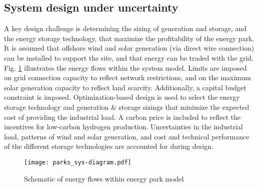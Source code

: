 \subsection{System design under uncertainty}

A key design challenge is determining the sizing of generation and storage, and the energy storage technology, that maximize the profitability of the energy park. It is assumed that offshore wind and solar generation (via direct wire connection) can be installed to support the site, and that energy can be traded with the grid. Fig. \ref{fig:parks-system-diagram} illustrates the energy flows within the system model. Limits are imposed on grid connection capacity to reflect network restrictions, and on the maximum solar generation capacity to reflect land scarcity. Additionally, a capital budget constraint is imposed. Optimization-based design is used to select the energy storage technology and generation \& storage sizings that minimize the expected cost of providing the industrial load. A carbon price is included to reflect the incentives for low-carbon hydrogen production. Uncertainties in the industrial load, patterns of wind and solar generation, and cost and technical performance of the different storage technologies are accounted for during design.

\begin{figure}[t]
    \centering
    \texttt{[image: parks\_sys-diagram.pdf]}
    \smallskip
    \caption{Schematic of energy flows within energy park model}
    \label{fig:parks-system-diagram}
\end{figure}


